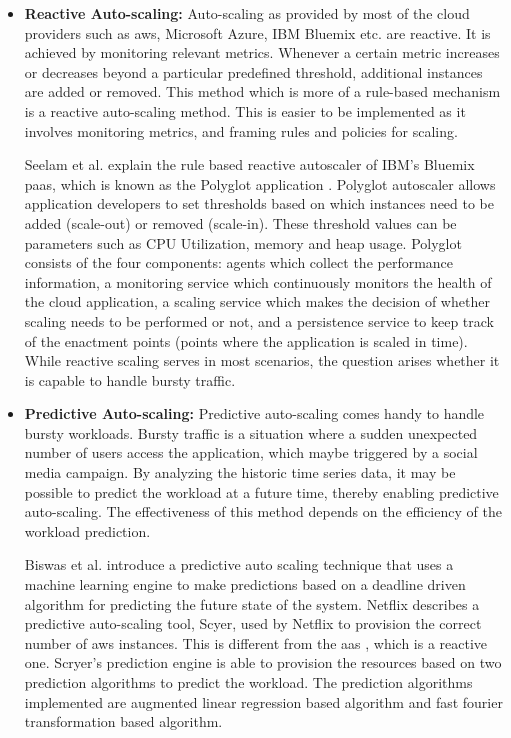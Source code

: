 \documentclass[article,type=msc,colorback,12pt,accentcolor=tud8b,table]{tudthesis}
\begin{document}
	\begin{itemize}
	
	\item{\textbf{Reactive Auto-scaling: }}Auto-scaling as provided by most of the cloud providers such as \gls{aws}, Microsoft Azure, IBM Bluemix etc. are reactive. It is achieved by monitoring relevant metrics. Whenever a certain metric increases or decreases beyond a particular predefined threshold, additional instances are added or removed. This method which is more of a rule-based mechanism is a reactive auto-scaling method. This is easier to be implemented as it involves monitoring metrics, and framing rules and policies for scaling. 
	
	Seelam et al. explain the rule based reactive autoscaler of IBM's Bluemix \gls{paas}, which is known as the Polyglot application \cite{seelam2015polyglot}. Polyglot autoscaler allows application developers to set thresholds based on which instances need to be added (scale-out) or removed (scale-in). These threshold values can be parameters such as CPU Utilization, memory and heap usage. Polyglot consists of the four components: agents which collect the performance information, a monitoring service which continuously monitors the health of the cloud application, a scaling service which makes the decision of whether scaling needs to be performed or not, and a persistence service to keep track of the enactment points (points where the application is scaled in time). While reactive scaling serves in most scenarios, the question arises whether it is capable to handle bursty traffic.

\item{\textbf{Predictive Auto-scaling: }}Predictive auto-scaling comes handy to handle bursty workloads. Bursty traffic is a situation where a sudden unexpected number of users access the application, which maybe triggered by a social media campaign. By analyzing the historic time series data, it may be possible to predict the workload at a future time, thereby enabling predictive auto-scaling. The effectiveness of this method depends on the efficiency of the workload prediction.

Biswas et al. \cite{biswas2015predictive} introduce a predictive auto scaling technique that uses a machine learning engine to make predictions based on a deadline driven algorithm for predicting the future state of the system. Netflix\cite{Scryer1, Scryer2} describes a predictive auto-scaling tool, Scyer, used by Netflix to provision the correct number of \gls{aws} \cite{aws} instances. This is different from the \gls{aas} \cite{aas}, which is a reactive one. Scryer's prediction engine is able to provision the resources based on two prediction algorithms to predict the workload. The prediction algorithms implemented are augmented linear regression based algorithm and fast fourier transformation based algorithm.


\end{itemize}
\end{document}
